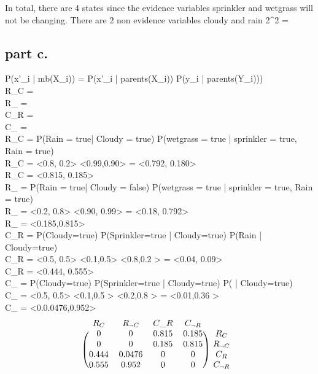   In total, there are 4 states since the evidence variables sprinkler and wetgrass will not be changing.
  There are 2 non evidence variables cloudy and rain 2^2 = 

\subsection{part c.}

\noindent
P(x'_i | mb(X_i)) = \alpha P(x'_i | parents(X_i)) P(y_i | parents(Y_i))) \\

\noindent
R_C         =  \\
R_{} =  \\
C_R         =  \\
C_{} =   \\

\noindent
R_C        = \alpha P(Rain = true| Cloudy = true) P(wetgrass = true | sprinkler = true, Rain = true) \\
R_C        = \alpha <0.8, 0.2> <0.99,0.90> = \alpha <0.792, 0.180> \\
R_C        =  <0.815, 0.185> \\

\noindent
R_{}  = \alpha P(Rain = true| Cloudy = false) P(wetgrass = true | sprinkler = true, Rain = true) \\
R_{}  = \alpha <0.2, 0.8> <0.90, 0.99> = \alpha <0.18, 0.792> \\
R_{}  = <0.185,0.815> \\

\noindent
C_R        = \alpha P(Cloudy=true) P(Sprinkler=true | Cloudy=true) P(Rain | Cloudy=true) \\
C_R        = \alpha <0.5, 0.5> <0.1,0.5> <0.8,0.2 > = \alpha <0.04, 0.09>  \\
C_R        = <0.444, 0.555> \\

\noindent
C_{}   = \alpha P(Cloudy=true) P(Sprinkler=true | Cloudy=true) P( | Cloudy=true) \\
C_{}   = \alpha <0.5, 0.5> <0.1,0.5 > <0.2,0.8 > = \alpha <0.01,0.36 >  \\
C_{}   = <0.0.0476,0.952>    \\


  \[
\begin{blockarray}{ccccc}
R_C & R_{\neg{C}}  & C\_R & C_{\neg{R}} \\
\begin{block}{(cccc)c}
  0         & 0      & 0.815  & 0.185  & R_C   \\
  0         & 0      & 0.185  & 0.815  & R_{\neg{C}} \\
  0.444     & 0.0476 & 0      & 0      & C_R  \\
  0.555     & 0.952  & 0      & 0      & C_{\neg{R}} \\
\end{block}
\end{blockarray}
 \]
